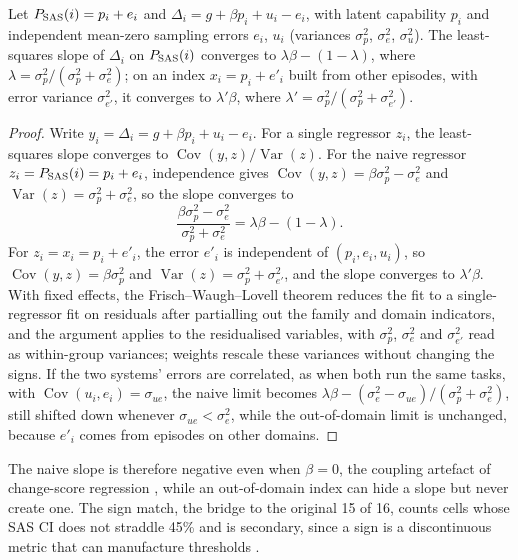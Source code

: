 \begin{lemma}[Coupling]
\label{lem:coupling}
Let $P_{\text{\textup{SAS}}}(i)=p_i+e_i$ and $\Delta_i=g+\beta p_i+u_i-e_i$, with latent capability $p_i$ and independent mean-zero sampling errors $e_i$, $u_i$ (variances $\sigma_p^2$, $\sigma_e^2$, $\sigma_u^2$). The least-squares slope of $\Delta_i$ on $P_{\text{\textup{SAS}}}(i)$ converges to $\lambda\beta-(1-\lambda)$, where $\lambda=\sigma_p^2/(\sigma_p^2+\sigma_e^2)$; on an index $x_i=p_i+e'_i$ built from other episodes, with error variance $\sigma_{e'}^2$, it converges to $\lambda'\beta$, where $\lambda'=\sigma_p^2/(\sigma_p^2+\sigma_{e'}^2)$.
\end{lemma}
\begin{proof}
Write $y_i=\Delta_i=g+\beta p_i+u_i-e_i$. For a single regressor $z_i$, the least-squares slope converges to $\operatorname{Cov}(y,z)/\operatorname{Var}(z)$. For the naive regressor $z_i=P_{\text{\textup{SAS}}}(i)=p_i+e_i$, independence gives $\operatorname{Cov}(y,z)=\beta\sigma_p^2-\sigma_e^2$ and $\operatorname{Var}(z)=\sigma_p^2+\sigma_e^2$, so the slope converges to
\begin{equation*}
\frac{\beta\sigma_p^2-\sigma_e^2}{\sigma_p^2+\sigma_e^2}=\lambda\beta-(1-\lambda).
\end{equation*}
For $z_i=x_i=p_i+e'_i$, the error $e'_i$ is independent of $(p_i,e_i,u_i)$, so $\operatorname{Cov}(y,z)=\beta\sigma_p^2$ and $\operatorname{Var}(z)=\sigma_p^2+\sigma_{e'}^2$, and the slope converges to $\lambda'\beta$. With fixed effects, the Frisch--Waugh--Lovell theorem reduces the fit to a single-regressor fit on residuals after partialling out the family and domain indicators, and the argument applies to the residualised variables, with $\sigma_p^2$, $\sigma_e^2$ and $\sigma_{e'}^2$ read as within-group variances; weights rescale these variances without changing the signs. If the two systems' errors are correlated, as when both run the same tasks, with $\operatorname{Cov}(u_i,e_i)=\sigma_{ue}$, the naive limit becomes $\lambda\beta-(\sigma_e^2-\sigma_{ue})/(\sigma_p^2+\sigma_e^2)$, still shifted down whenever $\sigma_{ue}<\sigma_e^2$, while the out-of-domain limit is unchanged, because $e'_i$ comes from episodes on other domains.
\end{proof}
The naive slope is therefore negative even when $\beta=0$, the coupling artefact of change-score regression \citep{tu2007change}, while an out-of-domain index can hide a slope but never create one. The sign match, the bridge to the original 15 of 16, counts cells whose SAS CI does not straddle 45\% and is secondary, since a sign is a discontinuous metric that can manufacture thresholds \citep{schaeffer2023mirage}.

